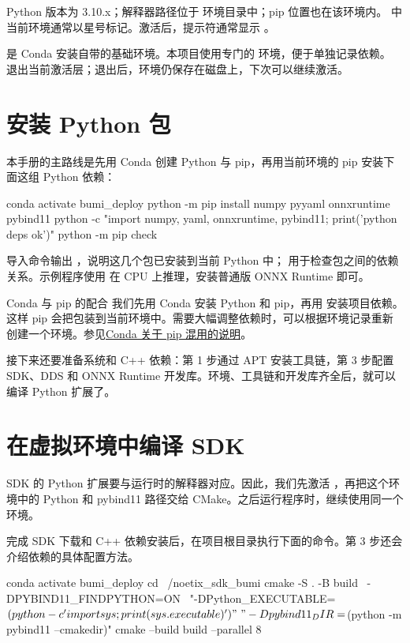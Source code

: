 \begin{expected}
Python 版本为 3.10.x；解释器路径位于  环境目录中；pip 位置也在该环境内。 中当前环境通常以星号标记。激活后，提示符通常显示 。
\end{expected}

 是 Conda 安装自带的基础环境。本项目使用专门的  环境，便于单独记录依赖。 退出当前激活层；退出后，环境仍保存在磁盘上，下次可以继续激活。

\section{安装 Python 包}
本手册的主路线是先用 Conda 创建 Python 与 pip，再用当前环境的 pip 安装下面这组 Python 依赖：
\begin{command}
conda activate bumi_deploy
python -m pip install numpy pyyaml onnxruntime pybind11
python -c "import numpy, yaml, onnxruntime, pybind11; print('python deps ok')"
python -m pip check
\end{command}
导入命令输出 ，说明这几个包已安装到当前 Python 中； 用于检查包之间的依赖关系。示例程序使用  在 CPU 上推理，安装普通版 ONNX Runtime 即可。

\begin{remark}{Conda 与 pip 的配合}
我们先用 Conda 安装 Python 和 pip，再用  安装项目依赖。这样 pip 会把包装到当前环境中。需要大幅调整依赖时，可以根据环境记录重新创建一个环境。参见\href{https://docs.conda.io/projects/conda/en/stable/user-guide/tasks/manage-environments.html#using-pip-in-an-environment}{Conda 关于 pip 混用的说明}。
\end{remark}

接下来还要准备系统和 C++ 依赖：第 1 步通过 APT 安装工具链，第 3 步配置 SDK、DDS 和 ONNX Runtime 开发库。环境、工具链和开发库齐全后，就可以编译 Python 扩展了。

\section{在虚拟环境中编译 SDK}
\label{sec:conda-build}
SDK 的 Python 扩展要与运行时的解释器对应。因此，我们先激活 ，再把这个环境中的 Python 和 pybind11 路径交给 CMake。之后运行程序时，继续使用同一个环境。

完成 SDK 下载和 C++ 依赖安装后，在项目根目录执行下面的命令。第 3 步还会介绍依赖的具体配置方法。
\begin{command}
conda activate bumi_deploy
cd ~/noetix_sdk_bumi
cmake -S . -B build \
  -DPYBIND11_FINDPYTHON=ON \
  "-DPython_EXECUTABLE=$(python -c 'import sys; print(sys.executable)')" \
  "-Dpybind11_DIR=$(python -m pybind11 --cmakedir)"
cmake --build build --parallel 8
\end{command}

